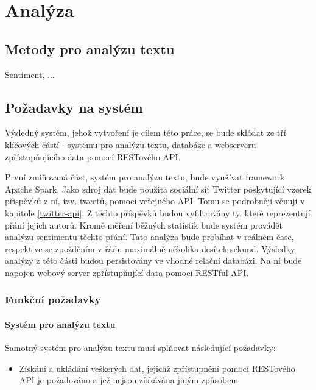 \documentclass[thesis=B,czech]{FITthesis}[2012/06/26]
\begin{document}




\chapter{Analýza}
\section{Metody pro analýzu textu}
	Sentiment, ...

\section{Požadavky na systém}
	Výsledný systém, jehož vytvoření je cílem této práce, se bude skládat ze tří klíčových částí - systému pro analýzu textu, databáze a webserveru zpřístupňujícího data pomocí RESTového API.
	
	 První zmiňovaná část, systém pro analýzu textu, bude využívat framework Apache Spark. Jako zdroj dat bude použita sociální síť Twitter poskytující vzorek přispěvků z ní, tzv. tweetů, pomocí veřejného API. Tomu se podrobněji věnuji v kapitole \ref{twitter-api}. Z těchto příspěvků budou vyfiltrovány ty, které reprezentují přání jejich autorů. Kromě měření běžných statistik bude systém provádět analýzu sentimentu těchto přání. Tato analýza bude probíhat v reálném čase, respektive se zpožděním v řádu maximálně několika desítek sekund.  Výsledky analýzy z této části budou persistovány ve vhodné relační databázi. Na ní bude napojen webový server zpřístupňující data pomocí RESTful API. 

\subsection{Funkční požadavky}
\subsubsection{Systém pro analýzu textu}
Samotný systém pro analýzu textu musí splňovat následující požadavky:
\begin{itemize}
\item Získání a ukládání veškerých dat, jejichž zpřístupnění pomocí RESTového API je požadováno a jež nejsou získávána jiným způsobem
\end{itemize}
\end{document}
